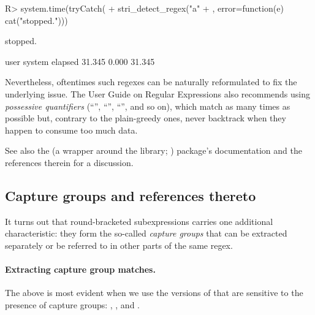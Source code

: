 \documentclass[nojss]{jss}\usepackage[]{graphicx}\usepackage[]{color}
\begin{document}
\begin{Schunk}
\begin{Sinput}
R> system.time(tryCatch({
+    stri_detect_regex("a" %s*% 1000 %s+% "c", "(a+)+b", time_limit=1e5)
+  }, error=function(e) cat("stopped.")))
\end{Sinput}
\begin{Soutput}
stopped.
\end{Soutput}
\begin{Soutput}
   user  system elapsed
 31.345   0.000  31.345
\end{Soutput}
\end{Schunk}


Nevertheless, oftentimes such regexes can be naturally
reformulated to  fix the underlying issue.
The  User Guide on Regular Expressions also recommends using
\textit{possessive quantifiers} (``'', ``\code{*+}'', ``\code{++}'', and so on),
which match as many times as possible but, contrary to
the plain-greedy ones, never backtrack when they happen to consume too much data.

See also the  (a wrapper around the  library;
\citealp{re2r}) package's
documentation and the references therein for a discussion.




\subsection{Capture groups and references thereto}\label{Sec:Capturing}

It turns out that round-bracketed subexpressions carries one additional
characteristic: they form the so-called \textit{capture groups} that can
be extracted separately or be referred to in other parts of the same regex.




\paragraph{Extracting capture group matches.}
The above is most evident when we use the
versions of  that are sensitive to the presence
of capture groups:
,
, and
.
\end{document}
